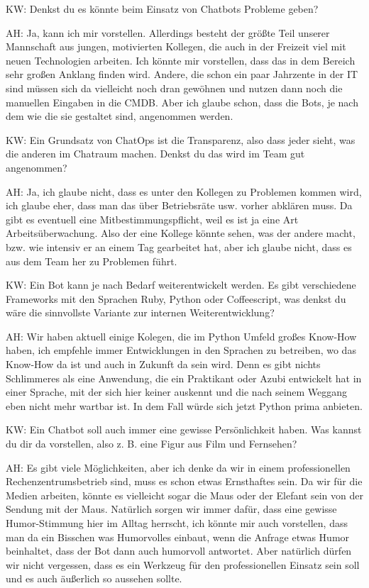 \begin{list}{X:}{\setlength{\labelsep}{5mm}}
\item [KW:] Denkst du es könnte beim Einsatz von Chatbots Probleme geben?
\item [AH:] Ja, kann ich mir vorstellen. Allerdings besteht der größte Teil unserer Mannschaft aus jungen, motivierten Kollegen, die auch in der Freizeit viel mit neuen Technologien arbeiten. Ich könnte mir vorstellen, dass das in dem Bereich sehr großen Anklang finden wird. Andere, die schon ein paar Jahrzente in der IT sind müssen sich da vielleicht noch dran gewöhnen und nutzen dann noch die manuellen Eingaben in die CMDB. Aber ich glaube schon, dass die Bots, je nach dem wie die sie gestaltet sind, angenommen werden.
\item [KW:] Ein Grundsatz von ChatOps ist die Transparenz, also dass jeder sieht, was die anderen im Chatraum machen. Denkst du das wird im Team gut angenommen?
\item [AH:] Ja, ich glaube nicht, dass es unter den Kollegen zu Problemen kommen wird, ich glaube eher, dass man das über Betriebsräte usw. vorher abklären muss. Da gibt es eventuell eine Mitbestimmungspflicht, weil es ist ja eine Art Arbeitsüberwachung. Also der eine Kollege könnte sehen, was der andere macht, bzw. wie intensiv er an einem Tag gearbeitet hat, aber ich glaube nicht, dass es aus dem Team her zu Problemen führt.
\item [KW:] Ein Bot kann je nach Bedarf weiterentwickelt werden. Es gibt verschiedene Frameworks mit den Sprachen Ruby, Python oder Coffeescript, was denkst du wäre die sinnvollste Variante zur internen Weiterentwicklung?
\item [AH:] Wir haben aktuell einige Kolegen, die im Python Umfeld großes Know-How haben, ich empfehle immer Entwicklungen in den Sprachen zu betreiben, wo das Know-How da ist und auch in Zukunft da sein wird. Denn es gibt nichts Schlimmeres als eine Anwendung, die ein Praktikant oder Azubi entwickelt hat in einer Sprache, mit der sich hier keiner auskennt und die nach seinem Weggang eben nicht mehr wartbar ist. In dem Fall würde sich jetzt Python prima anbieten.
\item [KW:] Ein Chatbot soll auch immer eine gewisse Persönlichkeit haben. Was kannst du dir da vorstellen, also z. B. eine Figur aus Film und Fernsehen?
\item [AH:] Es gibt viele Möglichkeiten, aber ich denke da wir in einem professionellen Rechenzentrumsbetrieb sind, muss es schon etwas Ernsthaftes sein. Da wir für die Medien arbeiten, könnte es vielleicht sogar die Maus oder der Elefant sein von der Sendung mit der Maus. Natürlich sorgen wir immer dafür, dass eine gewisse Humor-Stimmung hier im Alltag herrscht, ich könnte mir auch vorstellen, dass man da ein Bisschen was Humorvolles einbaut, wenn die Anfrage etwas Humor beinhaltet, dass der Bot dann auch humorvoll antwortet. Aber natürlich dürfen wir nicht vergessen, dass es ein Werkzeug für den professionellen Einsatz sein soll und es auch äußerlich so aussehen sollte.

\end{list}
